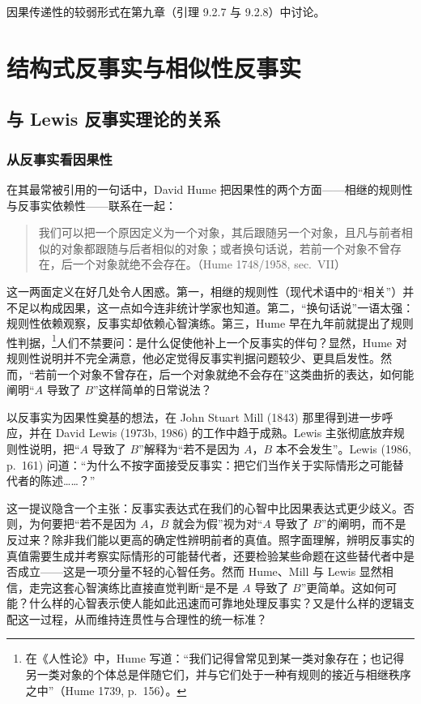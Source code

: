 因果传递性的较弱形式在第九章（引理 9.2.7 与 9.2.8）中讨论。

\section{结构式反事实与相似性反事实}

\subsection{与 Lewis 反事实理论的关系}

\subsubsection*{从反事实看因果性}

在其最常被引用的一句话中，David Hume 把因果性的两个方面——相继的规则性与反事实依赖性——联系在一起：

\begin{quote}
\kaishu
我们可以把一个原因定义为一个对象，其后跟随另一个对象，且凡与前者相似的对象都跟随与后者相似的对象；或者换句话说，若前一个对象不曾存在，后一个对象就绝不会存在。（Hume 1748/1958, sec.~VII）
\end{quote}

这一两面定义在好几处令人困惑。第一，相继的规则性（现代术语中的“相关”）并不足以构成因果，这一点如今连非统计学家也知道。第二，“换句话说”一语太强：规则性依赖观察，反事实却依赖心智演练。第三，Hume 早在九年前就提出了规则性判据，\footnote{在《人性论》中，Hume 写道：“我们记得曾常见到某一类对象存在；也记得另一类对象的个体总是伴随它们，并与它们处于一种有规则的接近与相继秩序之中”（Hume 1739, p.~156）。}人们不禁要问：是什么促使他补上一个反事实的伴句？显然，Hume 对规则性说明并不完全满意，他必定觉得反事实判据问题较少、更具启发性。然而，“若前一个对象不曾存在，后一个对象就绝不会存在”这类曲折的表达，如何能阐明“$A$ 导致了 $B$”这样简单的日常说法？

以反事实为因果性奠基的想法，在 John Stuart Mill (1843) 那里得到进一步呼应，并在 David Lewis (1973b, 1986) 的工作中趋于成熟。Lewis 主张彻底放弃规则性说明，把“$A$ 导致了 $B$”解释为“若不是因为 $A$，$B$ 本不会发生”。Lewis (1986, p.~161) 问道：“为什么不按字面接受反事实：把它们当作关于实际情形之可能替代者的陈述……？”

这一提议隐含一个主张：反事实表达式在我们的心智中比因果表达式更少歧义。否则，为何要把“若不是因为 $A$，$B$ 就会为假”视为对“$A$ 导致了 $B$”的阐明，而不是反过来？除非我们能以更高的确定性辨明前者的真值。照字面理解，辨明反事实的真值需要生成并考察实际情形的可能替代者，还要检验某些命题在这些替代者中是否成立——这是一项分量不轻的心智任务。然而 Hume、Mill 与 Lewis 显然相信，走完这套心智演练比直接直觉判断“是不是 $A$ 导致了 $B$”更简单。这如何可能？什么样的心智表示使人能如此迅速而可靠地处理反事实？又是什么样的逻辑支配这一过程，从而维持连贯性与合理性的统一标准？

